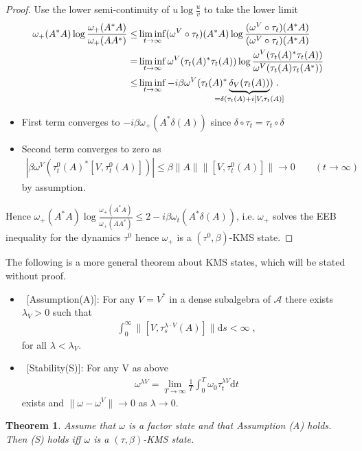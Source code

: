 \documentclass[
a4paper, %
11pt, %
onecolumn, %
openany, %
]{memoir}
\theoremstyle{definition}
\theoremstyle{remark}
\theoremstyle{plain}
\newtheorem{theorem}[definition]{Theorem}
\begin{document}
\begin{proof}
 Use the lower semi-continuity  of $u\log\frac{u}{v}$ to take the lower limit \begin{align}
 \omega_+(A^*A)\log\frac{\omega_+(A^*A)}{\omega_+(AA^*)}\leq& \liminf\limits_{t\rightarrow\infty} (\omega^V\circ \tau_t)(A^*A)\log\frac{(\omega^V\circ\tau_t)(A^*A)}{(\omega^V\circ\tau_t)(A^*A)}\\
 =& \liminf\limits_{t\rightarrow\infty} \omega^V(\tau_t(A)^*\tau_t(A))\log\frac{\omega^V(\tau_t(A)^*\tau_t(A))}{\omega^V(\tau_t(A)\tau_t(A^*))}\\
 \leq& \liminf\limits_{t\rightarrow\infty} -i\beta \omega^V(\tau_t(A)^*\underbrace{\delta_V(\tau_t(A))}_{\mathclap{=\delta(\tau_t(A)+i[V,\tau_t(A)]}})\; .
 \end{align}
\begin{itemize}
\item First term converges to $-i\beta\omega_+(A^*\delta(A))$ since $\delta\circ\tau_t=\tau_t\circ \delta$
\item Second term converges to zero as \begin{align}
|\beta\omega^V(\tau_t^0(A)^*[V,\tau_t^0(A)])|\leq \beta \|A\| \|[V,\tau_t^0(A)]\| \rightarrow 0 \qquad (t\rightarrow \infty)
\end{align}
by assumption.
\end{itemize}
Hence $\omega_+(A^*A)\log\frac{\omega_+(A^*A)}{\omega_+(AA^*)}\leq2-i\beta\omega_t(A^*\delta(A))$, i.e. $\omega_+$ solves the EEB inequality for the dynamics $\tau^0$ hence $\omega_+$ is a $(\tau^0,\beta)$-KMS state.
\end{proof}
The following is a more general theorem about KMS states, which will be stated without proof.
\begin{itemize}
\item ~[Assumption(A)]: For any $V=V^*$ in a dense subalgebra of $\mathcal{A}$ there exists $\lambda_V>0$ such that \begin{align}
\int_0^{\infty}\|[V,\tau_s^{\lambda\cdot V}(A)]\|\mathrm{d}s< \infty\;, 
\end{align}
for all $\lambda<\lambda_V$.
\item ~[Stability(S)]: For any V as above \begin{align}
\omega^{\lambda V}=\lim_{T\rightarrow\infty}\frac{1}{T}\int_0^T\omega_0\tau_t^{\lambda V}\mathrm{d}t
\end{align}
exists and $\|\omega-\omega^V\|\rightarrow 0$ as $\lambda\rightarrow 0$.
\end{itemize}
\begin{theorem}
Assume that $\omega$ is a factor state and that Assumption (A) holds. Then (S) holds iff $\omega$ is a $(\tau,\beta)$-KMS state.
\end{theorem}
\end{document}
